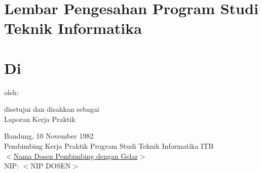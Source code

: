 \chapter*{
\large{Lembar Pengesahan Program Studi Teknik Informatika} \\ 
\thetitle \\
\vspace{5pt}
Di \perusahaanKP}

\vspace{8em}

\begin{center}
oleh:\\
\theauthor
\end{center}

\vspace{5em}
\begin{center}
    disetujui dan disahkan sebagai\\
    Laporan Kerja Praktik
\end{center}

\vspace{5em}
\begin{flushleft}
Bandung, 10 November 1982\\
Pembimbing Kerja Praktik Program Studi Teknik Informatika ITB\\
\vspace{5em}
\underline{$<$Nama Dosen Pembimbing dengan Gelar$>$}\\
NIP: $<$NIP DOSEN$>$
\end{flushleft}